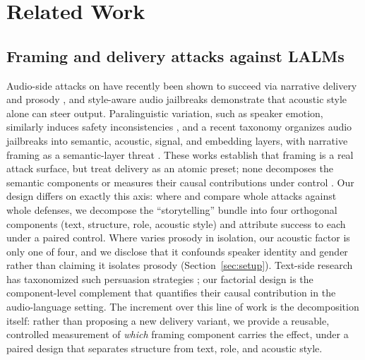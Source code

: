 \section{Related Work}
\label{sec:related}

\subsection{Framing and delivery attacks against LALMs}
Audio-side attacks on \LALMs have recently been shown to succeed via narrative
delivery \citep{nyhm} and prosody \citep{pjbreak}, and style-aware audio
jailbreaks \citep{stylebreak} demonstrate that acoustic style alone can steer
output. Paralinguistic variation, such as speaker emotion, similarly induces
safety inconsistencies \citep{feng2026emotional}, and a recent taxonomy
organizes audio jailbreaks into semantic, acoustic, signal, and embedding
layers, with narrative framing as a semantic-layer threat
\citep{feng2026audiojailbreaks}. These works establish that framing is a real
attack surface, but treat delivery as an atomic preset; none decomposes the
semantic components or measures their causal contributions under control
\citep{pjbreak,nyhm,stylebreak,feng2026emotional,feng2026audiojailbreaks}.
Our design differs on exactly this axis:
where \citet{nyhm} and \citet{stylebreak} compare whole attacks against whole
defenses, we decompose the ``storytelling'' bundle into four orthogonal
components (text, structure, role, acoustic style) and attribute success to
each under a paired control. Where \citet{pjbreak} varies prosody in
isolation, our acoustic factor is only one of four, and we disclose that it
confounds speaker identity and gender rather than claiming it isolates prosody
(Section~\ref{sec:setup}). Text-side research has taxonomized such persuasion
strategies \citep{wei2024}; our factorial design is the component-level
complement that quantifies their causal contribution in the audio-language
setting. The increment over this line of work is the decomposition itself:
rather than proposing a new delivery variant, we provide a reusable,
controlled measurement of \emph{which} framing component carries the effect,
under a paired design that separates structure from text, role, and acoustic
style.


